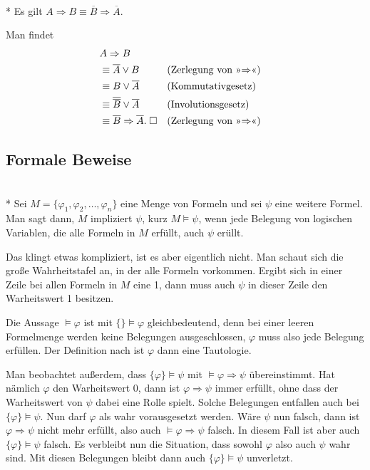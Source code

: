\begin{Satz}\mbox{}\\*
Es gilt $A\Rightarrow B\equiv \overline B\Rightarrow\overline A$.
\end{Satz}
 Man findet
\begin{align}
&A\Rightarrow B\\
&\equiv \overline A\lor B && (\text{Zerlegung von »$\Rightarrow$«})\\
&\equiv B\lor\overline A && (\text{Kommutativgesetz})\\
&\equiv \overline{\overline B}\lor\overline A && (\text{Involutionsgesetz})\\
&\equiv \overline B\Rightarrow\overline A.\;\Box
  && (\text{Zerlegung von »$\Rightarrow$«)}
\end{align}

\newpage
\subsection{Formale Beweise}
\begin{Definition}\mbox{}\\*
Sei $M=\{\varphi_1,\varphi_2,\ldots,\varphi_n\}$ eine Menge von
Formeln und sei $\psi$ eine weitere Formel. Man sagt dann, $M$
impliziert $\psi$, kurz $M\models\psi$, wenn jede Belegung von
logischen Variablen, die alle Formeln in $M$ erfüllt, auch $\psi$
erüllt.
\end{Definition}
Das klingt etwas kompliziert, ist es aber eigentlich nicht. Man schaut
sich die große Wahrheitstafel an, in der alle Formeln vorkommen.
Ergibt sich in einer Zeile bei allen Formeln in $M$ eine 1, dann muss
auch $\psi$ in dieser Zeile den Warheitswert 1 besitzen.

Die Aussage $\models\varphi$ ist mit $\{\}\models\varphi$
gleichbedeutend, denn bei einer leeren Formelmenge werden keine
Belegungen ausgeschlossen, $\varphi$ muss also jede Belegung
erfüllen. Der Definition nach ist $\varphi$ dann eine Tautologie.

Man beobachtet außerdem, dass $\{\varphi\}\models\psi$ mit
$\models\varphi\Rightarrow\psi$ übereinstimmt. Hat nämlich
$\varphi$ den Warheitswert 0, dann ist $\varphi\Rightarrow\psi$
immer erfüllt, ohne dass der Warheitswert von $\psi$ dabei eine
Rolle spielt. Solche Belegungen entfallen auch bei
$\{\varphi\}\models\psi$. Nun darf $\varphi$ als wahr vorausgesetzt
werden. Wäre $\psi$ nun falsch, dann ist $\varphi\Rightarrow\psi$
nicht mehr erfüllt, also auch $\models\varphi\Rightarrow\psi$ falsch.
In diesem Fall ist aber auch $\{\varphi\}\models\psi$ falsch.
Es verbleibt nun die Situation, dass sowohl $\varphi$ also auch
$\psi$ wahr sind. Mit diesen Belegungen bleibt dann auch
$\{\varphi\}\models\psi$ unverletzt.

